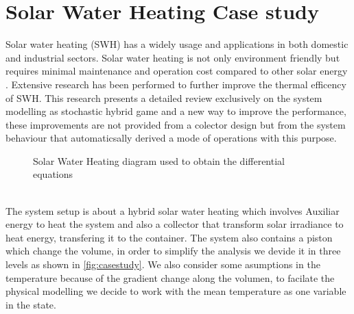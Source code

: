   \section{Solar Water Heating Case study}
    \label{sec:casestudy}
    Solar water heating (SWH) has a widely usage and applications in 
    both domestic and industrial sectors. Solar water heating is not only 
    environment friendly but requires minimal maintenance and operation 
    cost compared to other solar energy \cite{shukla2013recent}. Extensive
    research has been performed to further improve the thermal efficency of
    \ac{SWH}. This research presents a detailed review exclusively
    on the system modelling as stochastic hybrid game and a new way to improve
    the performance, these improvements are not provided from a colector design 
    but from the system behaviour that automaticsally derived a mode of operations 
    with this purpose. \\
    \begin{figure}[!hbt]
      \centering
      
      \captionsetup{format=hang}
      \caption{Solar Water Heating diagram used to obtain the differential equations}
      \label{fig:casestudy}
    \end{figure} \\
    The system setup is about a hybrid solar water heating which involves 
    Auxiliar energy to heat the system and also a collector that transform 
    solar irradiance to heat energy, transfering it to the container. The system also
    contains a piston which change the volume, in order to simplify the analysis 
    we devide it in three levels as shown in \autoref{fig:casestudy}. We also 
    consider some asumptions in the temperature because of the gradient change
    along the volumen, to facilate the physical modelling we decide to work with 
    the mean temperature as one variable in the state.
    \clearpage 
